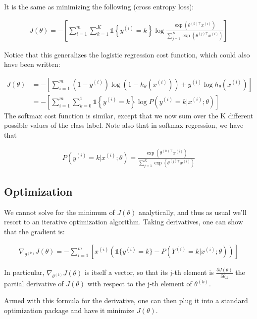 It is the same as minimizing the following (cross entropy loss):

\begin{align} 
	J(\theta) = - \left[ \sum_{i=1}^{m} \sum_{k=1}^{K} \mathds{1}\left\{y^{(i)} = k\right\} \log \frac{\exp(\theta^{(k)\top} x^{(i)})}{\sum_{j=1}^K \exp(\theta^{(j)\top} x^{(i)})}\right] 
\end{align}

Notice that this generalizes the logistic regression cost function, which could also have been written:

\begin{align}
	J(\theta) &= - \left[ \sum_{i=1}^m (1-y^{(i)}) \log (1-h_\theta(x^{(i)})) + y^{(i)} \log h_\theta(x^{(i)}) \right] \\ 
			  &= - \left[ \sum_{i=1}^{m} \sum_{k=0}^{1} \mathds{1}\left\{y^{(i)} = k\right\} \log P(y^{(i)} = k | x^{(i)} ; \theta) \right] 
\end{align}
The softmax cost function is similar, except that we now sum over the K different possible values of the class label. Note also that in softmax regression, we have that

\begin{align}
	P(y^{(i)} = k | x^{(i)} ; \theta) = \frac{\exp(\theta^{(k)\top} x^{(i)})}{\sum_{j=1}^K \exp(\theta^{(j)\top} x^{(i)}) }
\end{align}

\subsection{Optimization}

We cannot solve for the minimum of $J(\theta)$ analytically, and thus as usual we’ll resort to an iterative optimization algorithm. Taking derivatives, one can show that the gradient is:

\begin{align} \nabla_{\theta^{(k)}} J(\theta) = - \sum_{i=1}^{m}{ \left[ x^{(i)} \left( \mathds{1} \{ y^{(i)} = k\} - P(Y^{(i)} = k | x^{(i)}; \theta) \right) \right] } \end{align}

In particular, $\nabla_{\theta^{(k)}} J(\theta)$ is itself a vector, so that its j-th element is $\frac{\partial J(\theta)}{\partial \theta_{lk}}$ the partial derivative of $J(\theta)$ with respect to the j-th element of $\theta^{(k)}$.

Armed with this formula for the derivative, one can then plug it into a standard optimization package and have it minimize $J(\theta)$.

